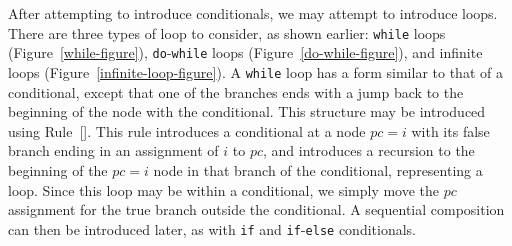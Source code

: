 After attempting to introduce conditionals, we may attempt to
introduce loops.
There are three types of loop to consider, as shown earlier:
\texttt{while} loops (Figure~\ref{while-figure}),
\texttt{do}-\texttt{while} loops (Figure~\ref{do-while-figure}), and
infinite loops (Figure~\ref{infinite-loop-figure}).
A \texttt{while} loop has a form similar to that of a conditional,
except that one of the branches ends with a jump back to the beginning
of the node with the conditional.
This structure may be introduced using
Rule~[].
This rule introduces a conditional at a node $pc=i$ with its false
branch ending in an assignment of $i$ to $pc$, and introduces a
recursion to the beginning of the $pc=i$ node in that branch of the
conditional, representing a loop.
Since this loop may be within a conditional, we simply move the $pc$
assignment for the true branch outside the conditional.
A sequential composition can then be introduced later, as with
\texttt{if} and \texttt{if}-\texttt{else} conditionals.
